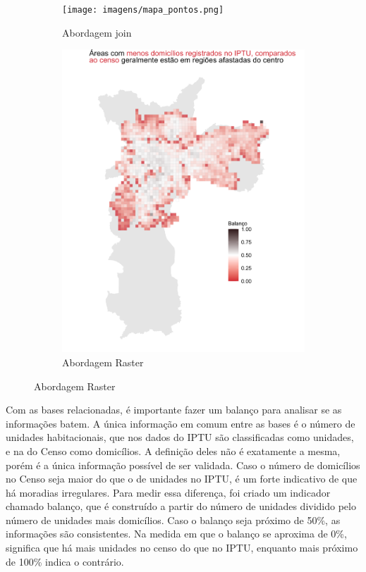 \begin{figure}
    \caption{Inconsistências entre dados do IPTU e do censo}
    \begin{subfigure}[t]{0.45\linewidth}
        \centering
        \texttt{[image: imagens/mapa\_pontos.png]}
        \caption{Abordagem join}
        \label{fig:pontos_erro}
    \end{subfigure}
    \hfill
    \begin{subfigure}[t]{0.45\linewidth}
        \includegraphics[width = \linewidth]{imagens/balanco_raster.png}
        \caption{Abordagem Raster}
        \label{fig:balanco-raster}
    \end{subfigure}
    \label{fig:erros-join}
\end{figure}

Com as bases relacionadas, é importante fazer um balanço para analisar se as informações batem. A única informação em comum entre as bases é o número de unidades habitacionais, que nos dados do IPTU são classificadas como unidades, e na do Censo como domicílios. A definição deles não é exatamente a mesma, porém é a única informação possível de ser validada. Caso o número de domicílios no Censo seja maior do que o de unidades no IPTU, é um forte indicativo de que há moradias irregulares. Para medir essa diferença, foi criado um indicador chamado balanço, que é construído a partir do número de unidades dividido pelo número de unidades mais domicílios. Caso o balanço seja próximo de 50\%, as informações são consistentes. Na medida em que o balanço se aproxima de 0\%, significa que há mais unidades no censo do que no IPTU, enquanto mais próximo de 100\% indica o contrário.

